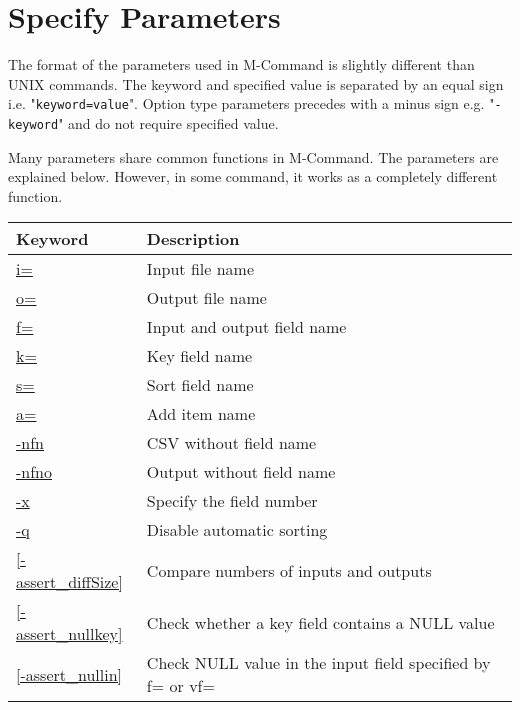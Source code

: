 %

\section{Specify Parameters}
The format of the parameters used in M-Command is slightly different than UNIX commands. 
The keyword and specified value is separated by an equal sign i.e.  "\verb|keyword=value|". 
Option type parameters precedes with a minus sign e.g. "\verb|-keyword|" and do not require specified value.

Many parameters share common functions in M-Command. The parameters are explained below. However, in some command, it works as a completely different function. 

\begin{table}[!htbp]
{\small
\begin{center}
\begin{tabular}{l|l}
\hline
Keyword&Description \\
\hline
\hyperref[sect:option_i]{i=}                & Input file name \\
\hyperref[sect:option_o]{o=}                & Output file name \\
\hyperref[sect:option_f]{f=}                & Input and output field name \\
\hyperref[sect:option_k]{k=}                & Key field name \\
\hyperref[sect:option_s]{s=}                & Sort field name  \\
\hyperref[sect:option_a]{a=}                & Add item name \\
\hyperref[sect:option_nfn]{-nfn}            & CSV without field name \\
\hyperref[sect:option_nfno]{-nfno}          & Output without field name \\
\hyperref[sect:option_x]{-x}                & Specify the field number \\
\hyperref[sect:option_q]{-q}                & Disable automatic sorting \\
\hyperref[sect:option_assert_diffSize]{[-assert\_diffSize]} & Compare numbers of inputs and outputs \\ %
\hyperref[sect:option_assert_nullkey]{[-assert\_nullkey]}   & Check whether a key field contains a NULL value \\ %
\hyperref[sect:option_assert_nullin]{[-assert\_nullin]}     & Check NULL value in the input field specified by f= or vf= \\ %

\end{tabular}
\end{center}}
\end{table}
